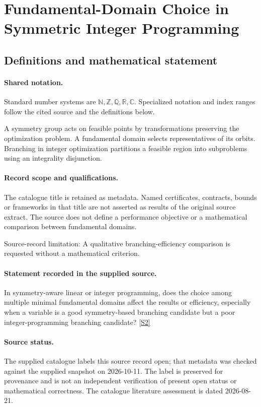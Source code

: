 \documentclass[11pt]{article}
\newcommand{\sref}[2]{\hyperlink{source:#1:#2}{[S#2]}}
\begin{document}
\section{Fundamental-Domain Choice in Symmetric Integer Programming}\label{statement}

\subsection{Definitions and mathematical statement}

\paragraph{Shared notation.}Standard number systems are $\mathbb N,\mathbb Z,\mathbb Q,\mathbb R,\mathbb C$. Specialized notation and index ranges follow the cited source and the definitions below.


A symmetry group acts on feasible points by transformations preserving the optimization problem. A fundamental domain selects representatives of its orbits. Branching in integer optimization partitions a feasible region into subproblems using an integrality disjunction.
\paragraph{Record scope and qualifications.}
The catalogue title is retained as metadata. Named certificates, contracts, bounds or frameworks in that title are not asserted as results of the original source extract.
The source does not define a performance objective or a mathematical comparison between fundamental domains.

Source-record limitation: A qualitative branching-efficiency comparison is requested without a mathematical criterion.
\paragraph{Statement recorded in the supplied source.}
In symmetry-aware linear or integer programming, does the choice among multiple minimal fundamental domains affect the results or efficiency, especially when a variable is a good symmetry-based branching candidate but a poor integer-programming branching candidate? \sref{statement}{2}
\paragraph{Source status.}
The supplied catalogue labels this source record open; that metadata was checked against the supplied snapshot on 2026-10-11. The label is preserved for provenance and is not an independent verification of present open status or mathematical correctness. The catalogue literature assessment is dated 2026-08-21.
\end{document}
